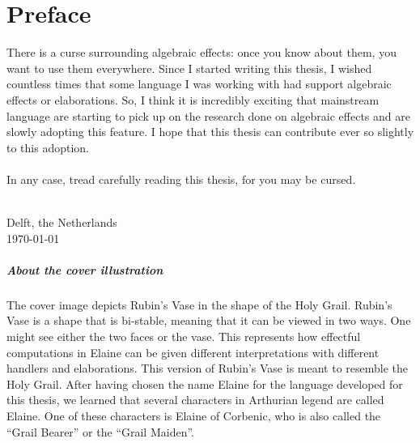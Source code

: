 \chapter{\label{chap:Preface}Preface}

There is a curse surrounding algebraic effects: once you know about them, you want to use them everywhere.
%
Since I started writing this thesis, I wished countless times that some language I was working with had support algebraic effects or elaborations.
%
So, I think it is incredibly exciting that mainstream language are starting to pick up on the research done on algebraic effects and are slowly adopting this feature. I hope that this thesis can contribute ever so slightly to this adoption.
\\\\
In any case, tread carefully reading this thesis, for you may be cursed.

\vspace{1cm}
\begin{flushright}
\theauthor{}\\
Delft, the Netherlands\\
\today{}\\
\end{flushright}

\vspace*{5em}
\paragraph{About the cover illustration} The cover image depicts Rubin's Vase in the shape of the Holy Grail. Rubin's Vase is a shape that is bi-stable, meaning that it can be viewed in two ways. One might see either the two faces or the vase. This represents how effectful computations in Elaine can be given different interpretations with different handlers and elaborations. This version of Rubin's Vase is meant to resemble the Holy Grail. After having chosen the name Elaine for the language developed for this thesis, we learned that several characters in Arthurian legend are called Elaine. One of these characters is Elaine of Corbenic, who is also called the ``Grail Bearer'' or the ``Grail Maiden''.
